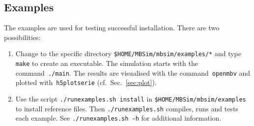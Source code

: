 \subsection{\MBSim Examples}
The examples are used for testing successful installation. There are two possibilities:
\begin{enumerate}
\item Change to the specific directory \texttt{\$HOME/MBSim/mbsim/examples/*} and type \texttt{make} to create an executable. The simulation starts with the command~\texttt{./main}. The results are visualised with the command~\texttt{openmbv} and plotted with~\texttt{h5plotserie} (cf.~Sec.~\ref{sec:plot}).
\item Use the script \texttt{./runexamples.sh install} in \texttt{\$HOME/MBSim/mbsim/examples} to install reference files. Then \texttt{./runexamples.sh} compiles, runs and tests each example. See \texttt{./runexamples.sh -h} for additional information.
\end{enumerate}

